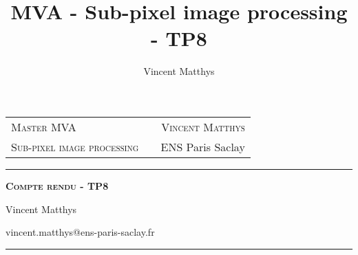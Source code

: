 \documentclass[12pt,a4paper,onecolumn]{article}
\title{MVA - Sub-pixel image processing - TP8}
\author{Vincent Matthys}
\begin{document}
\begin{tabularx}{0.9\textwidth}{@{} l X r @{} }
	{\textsc{Master MVA}}               &  & \textsc{Vincent Matthys} \\
	\textsc{Sub-pixel image processing} &  & {ENS Paris Saclay}       \\
\end{tabularx}
\vspace{1.5cm}
\begin{center}

	\rule[11pt]{5cm}{0.5pt}

	\textbf{\LARGE \textsc{Compte rendu - TP8}}
	\vspace{0.5cm}

	Vincent Matthys

	vincent.matthys@ens-paris-saclay.fr

	\rule{5cm}{0.5pt}

	\vspace{1.5cm}
\end{center}
\end{document}
